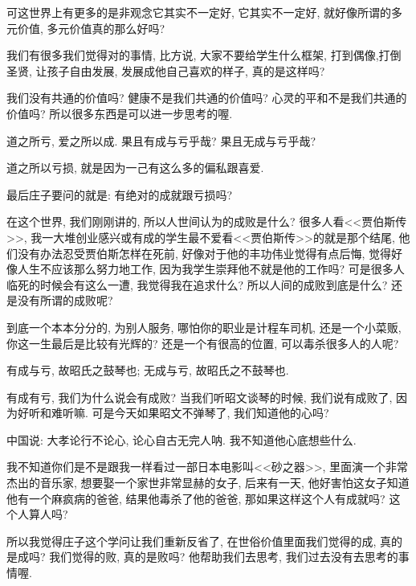 \documentclass[11pt]{article}
\begin{document}
可这世界上有更多的是非观念它其实不一定好, 它其实不一定好, 就好像所谓的多元价值, 多元价值真的那么好吗? 

我们有很多我们觉得对的事情, 比方说, 大家不要给学生什么框架, 打到偶像,打倒圣贤, 让孩子自由发展, 发展成他自己喜欢的样子, 真的是这样吗?

我们没有共通的价值吗? 健康不是我们共通的价值吗? 心灵的平和不是我们共通的价值吗? 所以很多东西是可以进一步思考的喔.



\begin{center}
	{\color{magenta} 道之所亏, 爱之所以成. 果且有成与亏乎哉? 果且无成与亏乎哉?}
\end{center}

\vspace{-0.5cm}

道之所以亏损, 就是因为一己有这么多的偏私跟喜爱. 

最后庄子要问的就是: 有绝对的成就跟亏损吗?

在这个世界, 我们刚刚讲的, 所以人世间认为的成败是什么? 很多人看<<贾伯斯传>>, 我一大堆创业感兴或有成的学生最不爱看<<贾伯斯传>>的就是那个结尾, 他们没有办法忍受贾伯斯怎样在死前, 好像对于他的丰功伟业觉得有点后悔, 觉得好像人生不应该那么努力地工作, 因为我学生崇拜他不就是他的工作吗? 可是很多人临死的时候会有这么一遭, 我觉得我在追求什么? 所以人间的成败到底是什么? 还是没有所谓的成败呢? 

到底一个本本分分的, 为别人服务, 哪怕你的职业是计程车司机, 还是一个小菜贩, 你这一生最后是比较有光辉的? 还是一个有很高的位置, 可以毒杀很多人的人呢? 

\begin{center}
	{\color{magenta} 有成与亏, 故昭氏之鼓琴也; 无成与亏, 故昭氏之不鼓琴也.}
\end{center}

\vspace{-0.5cm}

{\color{blue} 有成有亏}, 我们为什么说会有成败? 当我们听昭文谈琴的时候, 我们说有成败了, 因为好听和难听嘛. 可是今天如果昭文不弹琴了, 我们知道他的心吗? 

中国说: 大孝论行不论心, 论心自古无完人呐. 我不知道他心底想些什么.

我不知道你们是不是跟我一样看过一部日本电影叫<<砂之器>>, 里面演一个非常杰出的音乐家, 想要娶一个家世非常显赫的女子, 后来有一天, 他好害怕这女子知道他有一个麻疯病的爸爸, 结果他毒杀了他的爸爸, 那如果这样这个人有成就吗? 这个人算人吗? 

所以我觉得庄子这个学问让我们重新反省了, 在世俗价值里面我们觉得的成, 真的是成吗? 我们觉得的败, 真的是败吗? 他帮助我们去思考, 我们过去没有去思考的事情喔.
\end{document}
